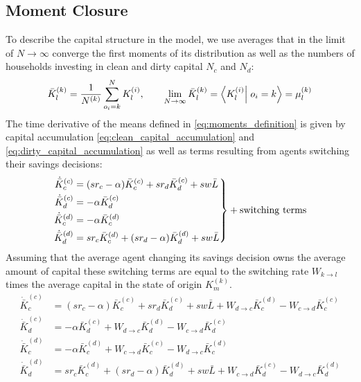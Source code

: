 \subsection{Moment Closure}

To describe the capital structure in the model, we use averages that in the limit of $N \rightarrow \infty$ converge the first moments of its distribution as well as the numbers of households investing in clean and dirty capital $N_c$ and $N_d$:
\begin{align}
	\bar{K}_l^{(k)} = \frac{1}{N^{(k)}}\sum_{o_i=k}^{N}K_l^{(i)}, \qquad \lim_{N \rightarrow \infty} \bar{K}_{l}^{(k)} = \braket{K_l^{(i)}}{o_i = k} = \mu_l^{(k)}
	\label{eq:moments_definition}
\end{align}
The time derivative of the means defined in \eqref{eq:moments_definition} is given by capital accumulation \eqref{eq:clean_capital_accumulation} and \eqref{eq:dirty_capital_accumulation} as well as terms resulting from agents switching their savings decisions: 
\begin{equation}
\left.  \begin{aligned}
		\dot{\bar{K}}_c^{(c)} &= (sr_c - \alpha)\bar{K}_c^{(c)} + s r_d \bar{K}_d^{(c)} + s w \bar{L} \nonumber \\
		\dot{\bar{K}}_d^{(c)} &= - \alpha\bar{K}_d^{(c)} \nonumber \\
		\dot{\bar{K}}_c^{(d)} &= - \alpha\bar{K}_c^{(d)} \nonumber \\
		\dot{\bar{K}}_d^{(d)} &= sr_c \bar{K}_c^{(d)} + (s r_d - \alpha)\bar{K}_d^{(d)} + s w \bar{L} \nonumber
	\end{aligned} \right\} + \rm{switching\ terms}
\end{equation}
Assuming that the average agent changing its savings decision owns the average amount of capital these switching terms are equal to the switching rate $W_{k \rightarrow l}$ times the average capital in the state of origin $K_m^{(k)}$.
\begin{align}
	\dot{\bar{K}}_c^{(c)} &= (sr_c - \alpha)\bar{K}_c^{(c)} + s r_d \bar{K}_d^{(c)} + s w \bar{L} + W_{d \rightarrow c} \bar{K}_c^{(d)} - W_{c \rightarrow d} \bar{K}_c^{(c)} \nonumber \\
	\dot{\bar{K}}_d^{(c)} &= - \alpha\bar{K}_d^{(c)} + W_{d \rightarrow c} \bar{K}_d^{(d)} - W_{c \rightarrow d} \bar{K}_d^{(c)} \nonumber \\
	\dot{\bar{K}}_c^{(d)} &= - \alpha\bar{K}_c^{(d)} + W_{c \rightarrow d} \bar{K}_c^{(c)} - W_{d \rightarrow c} \bar{K}_c^{(d)} \nonumber \\
	\dot{\bar{K}}_d^{(d)} &= sr_c \bar{K}_c^{(d)} + (s r_d - \alpha)\bar{K}_d^{(d)} + s w \bar{L} + W_{c \rightarrow d} \bar{K}_d^{(c)} - W_{d \rightarrow c} \bar{K}_d^{(d)}
	\label{eq:mean_capital_stocks}
\end{align}


